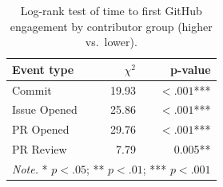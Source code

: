 \begin{table}[ht]
\centering
\scriptsize
\setlength{\tabcolsep}{4pt}
\renewcommand{\arraystretch}{0.88}
\caption{Log-rank test of time to first GitHub engagement by contributor group (higher vs.\ lower).}
\label{tab:logrank_git}
\begin{tabular}{l r r}
\toprule
\textbf{Event type} & \textbf{$\chi^2$} & \textbf{p-value} \\
\midrule
Commit & 19.93 & $< .001$*** \\
Issue Opened & 25.86 & $< .001$*** \\
PR Opened & 29.76 & $< .001$*** \\
PR Review & 7.79 & 0.005** \\
\midrule
\multicolumn{3}{l}{\textit{Note.} * $p < .05$; ** $p < .01$; *** $p < .001$} \\
\bottomrule
\end{tabular}
\end{table}
